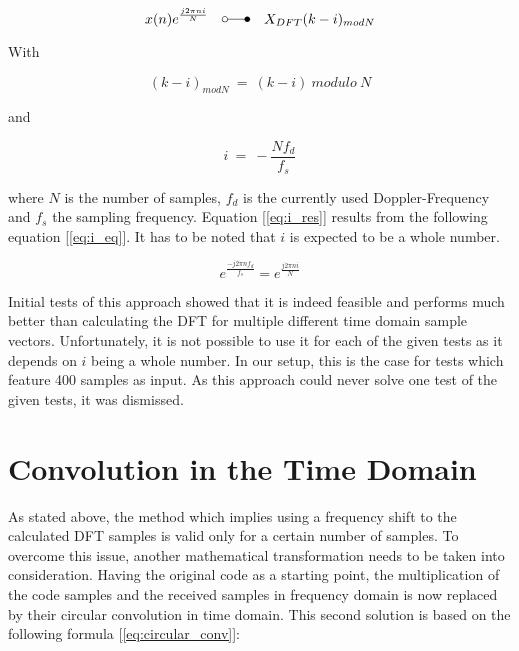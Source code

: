 			\begin{equation} 
				\label{eq:freq_dom_shift}
				x(n)e^{\frac{j2{\pi}ni}{N}}\quad \laplace\quad X_{DFT}(k-i)_{mod N} %
			\end{equation}

			With 

			\begin{equation} 
				(k-i)_{mod N}\ =\ (k-i)\ modulo\ N
			\end{equation}

			and 

			\begin{equation}
				\label{eq:i_res}
				i\ =\ -\frac{Nf_d}{f_s}
			\end{equation}

			where $N$ is the number of samples, $f_d$ is the currently used Doppler-Frequency and $f_s$ the sampling frequency. Equation [\ref{eq:i_res}] results from the following equation [\ref{eq:i_eq}]. It has to be noted that $i$ is expected to be a whole number.

			\begin{equation} 
				\label{eq:i_eq}
				e^{\frac{-j2{\pi}nf_d}{f_s}} = e^{\frac{j2{\pi}ni}{N}}
			\end{equation}

			Initial tests of this approach showed that it is indeed feasible and performs much better than calculating the DFT for multiple different time domain sample vectors. Unfortunately, it is not possible to use it for each of the given tests as it depends on $i$ being a whole number. In our setup, this is the case for tests which feature \num{400} samples as input. As this approach could never solve one test of the given tests, it was dismissed.
		
		\section{Convolution in the Time Domain} %
		\label{sec:convolution_in_the_time_domain}
	  		As stated above, the method which implies using a frequency shift to the calculated DFT samples is valid only for a certain number of samples. To overcome this issue, another mathematical transformation needs to be taken into consideration. Having the original code as a starting point, the multiplication of the code samples and the received samples in frequency domain is now replaced by their circular convolution in time domain. This second solution is based on the following formula [\ref{eq:circular_conv}]:

